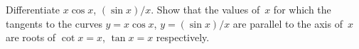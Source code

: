 Differentiate $x\cos x$, $(\sin x)/x$. Show that the values of~$x$ for which
the tangents to the curves $y = x\cos x$, $y = (\sin x)/x$ are parallel to the axis of~$x$
are roots of $\cot x = x$, $\tan x = x$ respectively.

